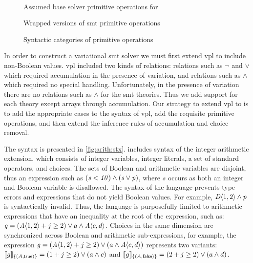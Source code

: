 ~\label{section:vsmt:primitives}
%
\begin{figure}
  
  \caption{Assumed base solver primitive operations for \evpl{}}%
  \label{fig:vsmt:primops}
\end{figure}
%
\begin{figure}
  
  \vspace{-3em}
  \caption{Wrapped versions of \ac{smt} primitive operations}%
  \label{fig:vsmt:primops}
\end{figure}
%
\begin{figure}
  
  \caption{Syntactic categories of primitive operations}%
  \label{fig:vsmt:primops}
\end{figure}
%

In order to construct a variational \ac{smt} solver we must first extend
\ac{vpl} to include non-Boolean values. \ac{vpl} included two kinds of
relations: relations such as $\neg$ and $\vee$ which required accumulation in
the presence of variation, and relations such as $\wedge$ which required no
special handling. Unfortunately, in the presence of variation there are no
relations such as $\wedge$ for the \ac{smt} theories. Thus we add support for
each theory except arrays through accumulation. Our strategy to extend \ac{vpl}
to \evpl{} is to add the appropriate cases to the syntax of \ac{vpl}, add the
requisite primitive operations, and then extend the inference rules of
accumulation and choice removal.

The \evpl{} syntax is presented in \autoref{fig:arith:stx}. \evpl{} includes
syntax of the integer arithmetic extension, which consists of integer variables,
integer literals, a set of standard operators, and choices.
%
The sets of Boolean and arithmetic variables are disjoint, thus an expression
such as $(\mathit{s < 10) \wedge (s \vee p})$, where $s$ occurs as both an integer
and Boolean variable is disallowed.
%
The syntax of the language prevents type errors and expressions that do not
yield Boolean values. For example, $\chc[D]{1,2} \wedge p$ is syntactically
invalid.
%
Thus, the language is purposefully limited to arithmetic expressions that
have an inequality at the root of the expression, such as: $\kf{g} =
(\chc[A]{1, 2} + j \geq 2) \vee a \wedge \chc[A]{c, d}$.
%
Choices in the same dimension are synchronized across Boolean and arithmetic
sub-expressions, for example, the expression
%
$\kf{g} = (\chc[A]{1, 2} + j \geq 2) \vee (a \wedge \chc[A]{c,d})$
represents two variants:
%
$\sem[\{(A, \true)\}]{g} = (1 + j \geq 2) \vee (a \wedge c)$ and
$\sem[\{(A, \false)\}]{g} = (2 + j \geq 2) \vee (a \wedge d)$.

